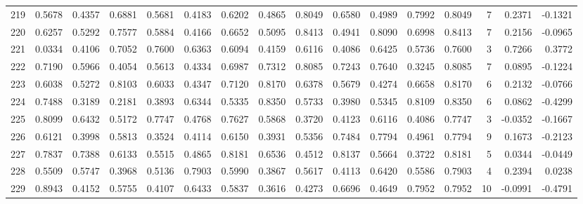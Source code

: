 \begin{tabular}{lrrrrrrrrrrrrrrr}
219 &      0.5678 &  0.4357 &  0.6881 &  0.5681 &  0.4183 &  0.6202 &  0.4865 &  0.8049 &  0.6580 &  0.4989 &   0.7992 &     0.8049 &      7 &                    0.2371 &                    -0.1321 \\
220 &      0.6257 &  0.5292 &  0.7577 &  0.5884 &  0.4166 &  0.6652 &  0.5095 &  0.8413 &  0.4941 &  0.8090 &   0.6998 &     0.8413 &      7 &                    0.2156 &                    -0.0965 \\
221 &      0.0334 &  0.4106 &  0.7052 &  0.7600 &  0.6363 &  0.6094 &  0.4159 &  0.6116 &  0.4086 &  0.6425 &   0.5736 &     0.7600 &      3 &                    0.7266 &                     0.3772 \\
222 &      0.7190 &  0.5966 &  0.4054 &  0.5613 &  0.4334 &  0.6987 &  0.7312 &  0.8085 &  0.7243 &  0.7640 &   0.3245 &     0.8085 &      7 &                    0.0895 &                    -0.1224 \\
223 &      0.6038 &  0.5272 &  0.8103 &  0.6033 &  0.4347 &  0.7120 &  0.8170 &  0.6378 &  0.5679 &  0.4274 &   0.6658 &     0.8170 &      6 &                    0.2132 &                    -0.0766 \\
224 &      0.7488 &  0.3189 &  0.2181 &  0.3893 &  0.6344 &  0.5335 &  0.8350 &  0.5733 &  0.3980 &  0.5345 &   0.8109 &     0.8350 &      6 &                    0.0862 &                    -0.4299 \\
225 &      0.8099 &  0.6432 &  0.5172 &  0.7747 &  0.4768 &  0.7627 &  0.5868 &  0.3720 &  0.4123 &  0.6116 &   0.4086 &     0.7747 &      3 &                   -0.0352 &                    -0.1667 \\
226 &      0.6121 &  0.3998 &  0.5813 &  0.3524 &  0.4114 &  0.6150 &  0.3931 &  0.5356 &  0.7484 &  0.7794 &   0.4961 &     0.7794 &      9 &                    0.1673 &                    -0.2123 \\
227 &      0.7837 &  0.7388 &  0.6133 &  0.5515 &  0.4865 &  0.8181 &  0.6536 &  0.4512 &  0.8137 &  0.5664 &   0.3722 &     0.8181 &      5 &                    0.0344 &                    -0.0449 \\
228 &      0.5509 &  0.5747 &  0.3968 &  0.5136 &  0.7903 &  0.5990 &  0.3867 &  0.5617 &  0.4113 &  0.6420 &   0.5586 &     0.7903 &      4 &                    0.2394 &                     0.0238 \\
229 &      0.8943 &  0.4152 &  0.5755 &  0.4107 &  0.6433 &  0.5837 &  0.3616 &  0.4273 &  0.6696 &  0.4649 &   0.7952 &     0.7952 &     10 &                   -0.0991 &                    -0.4791 \\

\end{tabular}
